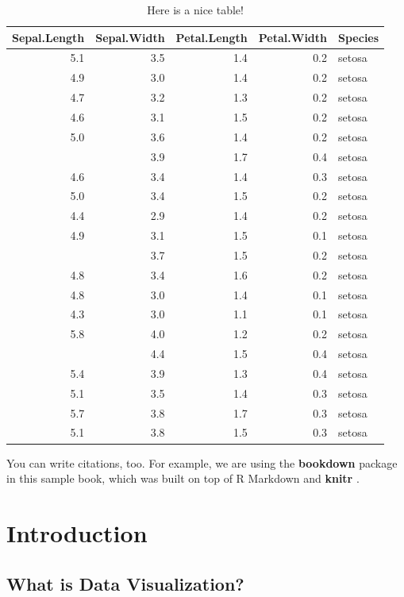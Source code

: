 \documentclass[]{book}
\theoremstyle{definition}
\theoremstyle{definition}
\theoremstyle{definition}
\theoremstyle{remark}
\begin{document}
\begin{table}

\caption{\label{tab:nice-tab}Here is a nice table!}
\centering
\begin{tabular}[t]{rrrrl}
\toprule
Sepal.Length & Sepal.Width & Petal.Length & Petal.Width & Species\\
\midrule
5.1 & 3.5 & 1.4 & 0.2 & setosa\\
4.9 & 3.0 & 1.4 & 0.2 & setosa\\
4.7 & 3.2 & 1.3 & 0.2 & setosa\\
4.6 & 3.1 & 1.5 & 0.2 & setosa\\
5.0 & 3.6 & 1.4 & 0.2 & setosa\\
\addlinespace
5.4 & 3.9 & 1.7 & 0.4 & setosa\\
4.6 & 3.4 & 1.4 & 0.3 & setosa\\
5.0 & 3.4 & 1.5 & 0.2 & setosa\\
4.4 & 2.9 & 1.4 & 0.2 & setosa\\
4.9 & 3.1 & 1.5 & 0.1 & setosa\\
\addlinespace
5.4 & 3.7 & 1.5 & 0.2 & setosa\\
4.8 & 3.4 & 1.6 & 0.2 & setosa\\
4.8 & 3.0 & 1.4 & 0.1 & setosa\\
4.3 & 3.0 & 1.1 & 0.1 & setosa\\
5.8 & 4.0 & 1.2 & 0.2 & setosa\\
\addlinespace
5.7 & 4.4 & 1.5 & 0.4 & setosa\\
5.4 & 3.9 & 1.3 & 0.4 & setosa\\
5.1 & 3.5 & 1.4 & 0.3 & setosa\\
5.7 & 3.8 & 1.7 & 0.3 & setosa\\
5.1 & 3.8 & 1.5 & 0.3 & setosa\\
\bottomrule
\end{tabular}
\end{table}

You can write citations, too. For example, we are using the
\textbf{bookdown} package \citep{R-bookdown} in this sample book, which
was built on top of R Markdown and \textbf{knitr} \citep{xie2015}.

\chapter{Introduction}\label{introduction}

\section{What is Data Visualization?}\label{what-is-data-visualization}
\end{document}
